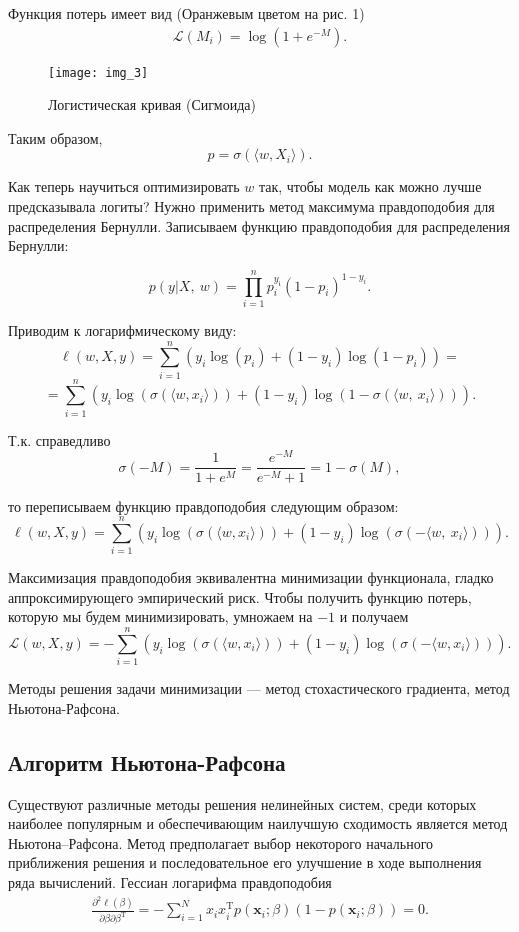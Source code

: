 \documentclass[12pt]{article}
\begin{document}
	Функция потерь имеет вид (Оранжевым цветом на рис. 1)
	\begin{eqnarray}\label{LossFunc}
		\mathcal{L}(M_i) = \log(1 + e^{-M}).
	\end{eqnarray}

	\begin{figure}[!ht]
		\centering
		\texttt{[image: img\_3]}
		\caption{Логистическая кривая (Сигмоида)}
		\label{3}
	\end{figure}

	\newpage
	
	Таким образом, 
	$$
	p=\sigma(\langle w,X_{i} \rangle).
	$$
	
	Как теперь научиться оптимизировать $w$ так, чтобы модель как можно
	лучше предсказывала логиты? Нужно применить метод максимума
	правдоподобия для распределения Бернулли. Записываем функцию правдоподобия для распределения Бернулли:
	
	$$
	p(y|X,\ w)=\prod_{i=1}^{n} p_{i}^{y_{\mathfrak{i}}}(1-p_{i})^{1-y_{i}}.
	$$
	
	Приводим к логарифмическому виду:
	$$
	\ell(w,X,y)=\sum_{i=1}^{n} (y_{i}\log(p_{i})+(1-y_{i})\log(1-p_{i}))=
	$$
	$$
	=\sum_{i=1}^{n} (y_{i}\log(\sigma(\langle w,x_{i} \rangle))+(1-y_{i})\log(1-\sigma(\langle w,\ x_{i}\rangle))).
	$$
	
	Т.к. справедливо 
	$$
	\sigma(-M)=\frac{1}{1+e^{M}}=\frac{e^{-M}}{e^{-M}+1}=1-\sigma(M),
	$$
		
	то переписываем функцию правдоподобия следующим образом:
	$$
	\ell(w,X,y)=\sum_{i=1}^{n}(y_{i} \log(\sigma(\langle w,x_{i} \rangle))+(1-y_{i})\log(\sigma(-\langle w,\ x_{i}\rangle))).
	$$
	
	Максимизация правдоподобия эквивалентна минимизации функционала, гладко аппроксимирующего эмпирический риск. Чтобы получить функцию потерь, которую мы будем минимизировать, умножаем на $-1$ и получаем
	$$
	\mathcal{L}(w,X,y)=-\sum_{i=1}^{n} (y_{i}\log(\sigma(\langle w,x_{i} \rangle))+(1-y_{i})\log(\sigma(-\langle w,x_{i} \rangle))).
	$$
	
	Методы решения задачи минимизации --- метод стохастического градиента, метод Ньютона-Рафсона.
	
	\subsection{Алгоритм Ньютона-Рафсона}
	
	Существуют различные методы решения нелинейных систем, среди
	которых наиболее популярным и обеспечивающим наилучшую сходимость является
	метод Ньютона–Рафсона. Метод предполагает выбор некоторого начального приближения решения и последовательное его улучшение в ходе выполнения ряда вычислений. Гессиан логарифма правдоподобия
	\begin{eqnarray}\label{Neuton-Raff}
		\frac{\partial^2 \ell(\beta)}{\partial \beta \partial \beta^{\mathrm{T}}} = -\sum_{i = 1}^N x_ix_i^\mathrm{T} p(\mathbf{x}_i; \beta)(1 - p(\mathbf{x}_i; \beta)) = 0.
	\end{eqnarray}
\end{document}

